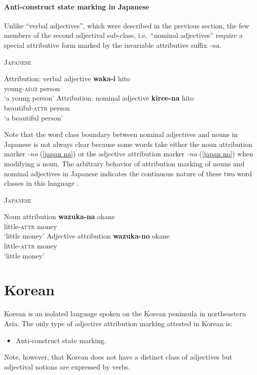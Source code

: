 \paragraph{Anti-construct state marking in Japanese}
Unlike “verbal adjectives”, which were described in the previous section, the few members of the second adjectival sub-class, i.e.~“nominal adjectives” require a special attributive form marked by the invariable attributive suffix \textit{-na}. 
\begin{exe}
\ex \textsc{Japanese} \citep[72-81]{pustet1989}%
\begin{xlist}
\ex Attribution: verbal adjective
\gll	\textbf{waka-i} hito\\
	young-\textsc{adjz} person\\
\glt	‘a young person’
\ex Attribution: nominal adjective
\gll	\textbf{kiree-na} hito\\
	beautiful-\textsc{attr} person\\
\glt	‘a beautiful person’
\end{xlist}
\end{exe}
Note that the word class boundary between nominal adjectives and nouns in Japanese is not always clear because some words take either the noun attribution marker \textit{-no} (\ref{japan na}) or the adjective attribution marker \textit{-na} (\ref{japan no}) when modifying a noun. The arbitrary behavior of attribution marking of nouns and nominal adjectives in Japanese indicates the continuous nature of these two word classes in this language \citep[79-80]{pustet1989}.
\begin{exe}
\ex \textsc{Japanese} \citep[72-81]{pustet1989}%
\begin{xlist}
\ex Noun attribution \label{japan na}
\gll	\textbf{wazuka-na} okane\\
	little-\textsc{attr} money\\
\glt	‘little money’
\ex Adjective attribution \label{japan no}
\gll	\textbf{wazuka-no} okane\\
	little-\textsc{attr} money\\
\glt	‘little money’
\end{xlist}
\end{exe}

\section{Korean}
Korean is an isolated language spoken on the Korean peninsula in northeastern Asia. The only type of adjective attribution marking attested in Korean is:
\begin{itemize}
\item Anti-construct state marking.
\end{itemize}
Note, however, that Korean does not have a distinct class of adjectives but adjectival notions are expressed by verbs.

